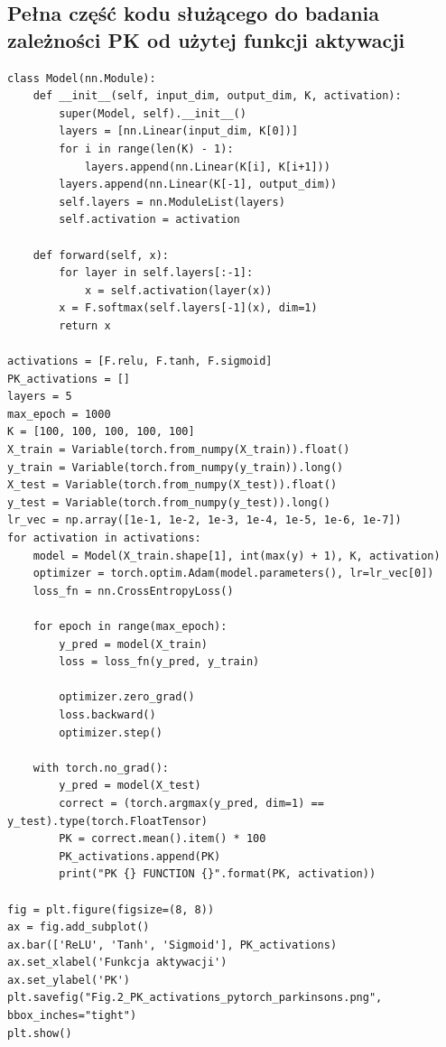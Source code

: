 \documentclass{article}
\begin{document}
\subsection{Pełna część kodu służącego do badania zależności PK od użytej funkcji aktywacji}
\begin{verbatim}
class Model(nn.Module):
    def __init__(self, input_dim, output_dim, K, activation):
        super(Model, self).__init__()
        layers = [nn.Linear(input_dim, K[0])]
        for i in range(len(K) - 1):
            layers.append(nn.Linear(K[i], K[i+1]))
        layers.append(nn.Linear(K[-1], output_dim))
        self.layers = nn.ModuleList(layers)
        self.activation = activation

    def forward(self, x):
        for layer in self.layers[:-1]:
            x = self.activation(layer(x))
        x = F.softmax(self.layers[-1](x), dim=1)
        return x

activations = [F.relu, F.tanh, F.sigmoid]
PK_activations = []
layers = 5
max_epoch = 1000
K = [100, 100, 100, 100, 100]
X_train = Variable(torch.from_numpy(X_train)).float()
y_train = Variable(torch.from_numpy(y_train)).long()
X_test = Variable(torch.from_numpy(X_test)).float()
y_test = Variable(torch.from_numpy(y_test)).long()
lr_vec = np.array([1e-1, 1e-2, 1e-3, 1e-4, 1e-5, 1e-6, 1e-7])
for activation in activations:
    model = Model(X_train.shape[1], int(max(y) + 1), K, activation)
    optimizer = torch.optim.Adam(model.parameters(), lr=lr_vec[0])
    loss_fn = nn.CrossEntropyLoss()

    for epoch in range(max_epoch):
        y_pred = model(X_train)
        loss = loss_fn(y_pred, y_train)

        optimizer.zero_grad()
        loss.backward()
        optimizer.step()

    with torch.no_grad():
        y_pred = model(X_test)
        correct = (torch.argmax(y_pred, dim=1) == y_test).type(torch.FloatTensor)
        PK = correct.mean().item() * 100
        PK_activations.append(PK)
        print("PK {} FUNCTION {}".format(PK, activation))

fig = plt.figure(figsize=(8, 8))
ax = fig.add_subplot()
ax.bar(['ReLU', 'Tanh', 'Sigmoid'], PK_activations)
ax.set_xlabel('Funkcja aktywacji')
ax.set_ylabel('PK')
plt.savefig("Fig.2_PK_activations_pytorch_parkinsons.png", bbox_inches="tight")
plt.show()
\end{verbatim}
\end{document}
